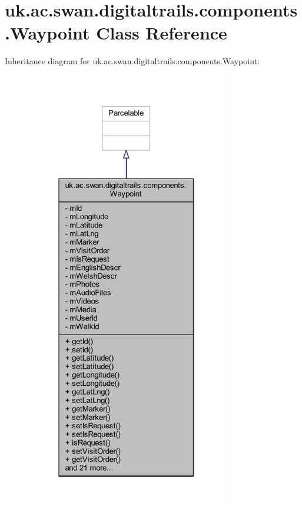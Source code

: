 \hypertarget{classuk_1_1ac_1_1swan_1_1digitaltrails_1_1components_1_1_waypoint}{\section{uk.\+ac.\+swan.\+digitaltrails.\+components.\+Waypoint Class Reference}
\label{classuk_1_1ac_1_1swan_1_1digitaltrails_1_1components_1_1_waypoint}
}


Inheritance diagram for uk.\+ac.\+swan.\+digitaltrails.\+components.\+Waypoint\+:
\nopagebreak
\begin{figure}[H]
\begin{center}
\leavevmode
\includegraphics[height=550pt]{classuk_1_1ac_1_1swan_1_1digitaltrails_1_1components_1_1_waypoint__inherit__graph}
\end{center}
\end{figure}


